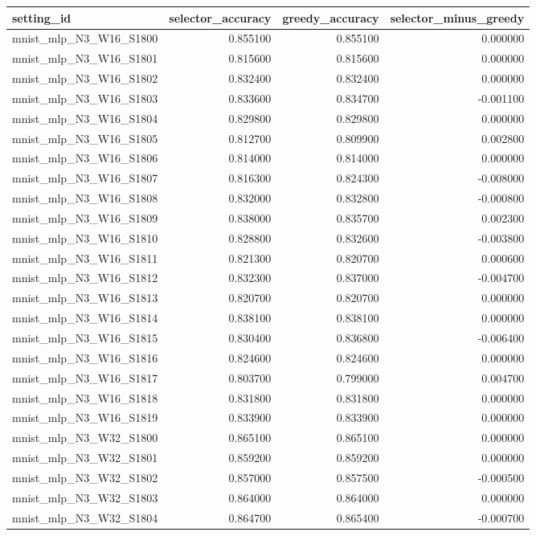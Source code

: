 \begin{tabular}{lrrr}
\toprule
setting_id & selector_accuracy & greedy_accuracy & selector_minus_greedy \\
\midrule
mnist_mlp_N3_W16_S1800 & 0.855100 & 0.855100 & 0.000000 \\
mnist_mlp_N3_W16_S1801 & 0.815600 & 0.815600 & 0.000000 \\
mnist_mlp_N3_W16_S1802 & 0.832400 & 0.832400 & 0.000000 \\
mnist_mlp_N3_W16_S1803 & 0.833600 & 0.834700 & -0.001100 \\
mnist_mlp_N3_W16_S1804 & 0.829800 & 0.829800 & 0.000000 \\
mnist_mlp_N3_W16_S1805 & 0.812700 & 0.809900 & 0.002800 \\
mnist_mlp_N3_W16_S1806 & 0.814000 & 0.814000 & 0.000000 \\
mnist_mlp_N3_W16_S1807 & 0.816300 & 0.824300 & -0.008000 \\
mnist_mlp_N3_W16_S1808 & 0.832000 & 0.832800 & -0.000800 \\
mnist_mlp_N3_W16_S1809 & 0.838000 & 0.835700 & 0.002300 \\
mnist_mlp_N3_W16_S1810 & 0.828800 & 0.832600 & -0.003800 \\
mnist_mlp_N3_W16_S1811 & 0.821300 & 0.820700 & 0.000600 \\
mnist_mlp_N3_W16_S1812 & 0.832300 & 0.837000 & -0.004700 \\
mnist_mlp_N3_W16_S1813 & 0.820700 & 0.820700 & 0.000000 \\
mnist_mlp_N3_W16_S1814 & 0.838100 & 0.838100 & 0.000000 \\
mnist_mlp_N3_W16_S1815 & 0.830400 & 0.836800 & -0.006400 \\
mnist_mlp_N3_W16_S1816 & 0.824600 & 0.824600 & 0.000000 \\
mnist_mlp_N3_W16_S1817 & 0.803700 & 0.799000 & 0.004700 \\
mnist_mlp_N3_W16_S1818 & 0.831800 & 0.831800 & 0.000000 \\
mnist_mlp_N3_W16_S1819 & 0.833900 & 0.833900 & 0.000000 \\
mnist_mlp_N3_W32_S1800 & 0.865100 & 0.865100 & 0.000000 \\
mnist_mlp_N3_W32_S1801 & 0.859200 & 0.859200 & 0.000000 \\
mnist_mlp_N3_W32_S1802 & 0.857000 & 0.857500 & -0.000500 \\
mnist_mlp_N3_W32_S1803 & 0.864000 & 0.864000 & 0.000000 \\
mnist_mlp_N3_W32_S1804 & 0.864700 & 0.865400 & -0.000700 \\

\end{tabular}
